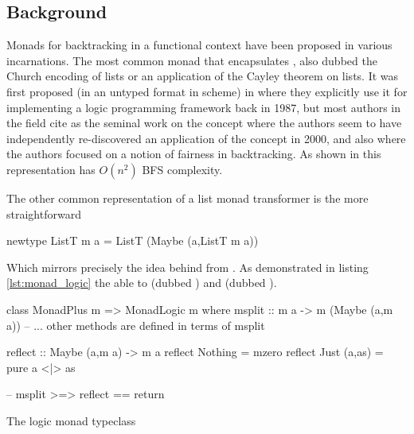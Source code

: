 \subsection{Background}

Monads for backtracking in a functional context have been proposed in
various incarnations.  The most common monad that encapsulates
, also
dubbed the Church encoding of lists or an application of the Cayley
theorem on lists. It was first proposed (in an untyped format in
scheme) in \cite{haynesLogicContinuations1987} where they explicitly
use it for implementing a logic programming framework back in 1987, but
most authors in the field cite
\cite{hinzeDerivingBacktrackingMonad2000a} as the seminal work on the
concept where the authors seem to have independently re-discovered an
application of the concept in 2000, and also
\cite{kiselyovBacktrackingInterleavingTerminating} where the authors
focused on a notion of fairness in backtracking. As shown in
\cite{kidneyAlgebrasWeightedSearch2021} this representation has
\(O(n^2)\) BFS complexity.

The other common representation of a list monad transformer is the more
straightforward

\begin{haskellcode}
newtype ListT m a = ListT (Maybe (a,ListT m a))
\end{haskellcode}

Which mirrors precisely the idea behind  from
\cite{kiselyovBacktrackingInterleavingTerminating}. As demonstrated in
listing \ref{lst:monad_logic} the  able to
 (dubbed ) and  (dubbed
).

\begin{code}
\begin{haskellcode}
class MonadPlus m => MonadLogic m where
  msplit :: m a -> m (Maybe (a,m a))
  -- ... other methods are defined in terms of msplit

reflect :: Maybe (a,m a) -> m a
reflect Nothing = mzero
reflect Just (a,as) = pure a <|> as

-- msplit >=> reflect == return
\end{haskellcode}
  \caption{\label{lst:monad_logic}The logic monad typeclass}
\end{code}

